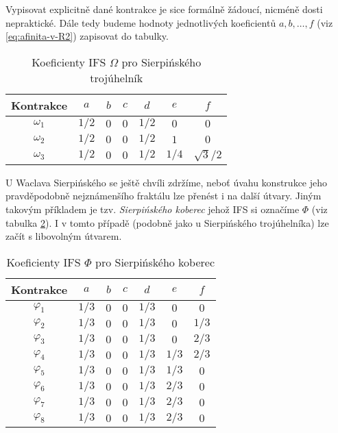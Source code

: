 Vypisovat explicitně dané kontrakce je sice formálně žádoucí, nicméně dosti nepraktické. Dále tedy budeme hodnoty jednotlivých koeficientů $a,b,\ldots,f$ (viz \eqref{eq:afinita-v-R2}) zapisovat do tabulky.
\begin{table}[h]
    \centering
    \begin{tabular}{c|cccccc}
    Kontrakce  & $a$   & $b$ & $c$ & $d$   & $e$   & $f$          \\\hline
    $\omega_1$ & $1/2$ & $0$ & $0$ & $1/2$ & $0$   & $0$          \\
    $\omega_2$ & $1/2$ & $0$ & $0$ & $1/2$ & $1$   & $0$          \\
    $\omega_3$ & $1/2$ & $0$ & $0$ & $1/2$ & $1/4$ & $\sqrt{3}/2$ \\
    \end{tabular}
    \caption{Koeficienty IFS $\Omega$ pro Sierpińského trojúhelník}
    \label{table:ifs-sierpinskeho-trojuhelnik}
\end{table}
U Waclava Sierpińského se ještě chvíli zdržíme, neboť úvahu konstrukce jeho pravděpodobně nejznámenšího fraktálu lze přenést i na další útvary. Jiným takovým příkladem je tzv. \emph{Sierpińského koberec} jehož IFS si označíme $\Phi$ (viz tabulka \ref{table:ifs-sierpinskeho-koberec}). I v tomto případě (podobně jako u Sierpińského trojúhelníka) lze začít s libovolným útvarem. 
\begin{table}[h]
    \centering
    \begin{tabular}{c|cccccc}
    Kontrakce  & $a$   & $b$ & $c$ & $d$   & $e$   & $f$          \\\hline
    $\varphi_1$ & $1/3$ & $0$ & $0$ & $1/3$ & $0$   & $0$         \\
    $\varphi_2$ & $1/3$ & $0$ & $0$ & $1/3$ & $0$   & $1/3$         \\
    $\varphi_3$ & $1/3$ & $0$ & $0$ & $1/3$ & $0$   & $2/3$         \\
    $\varphi_4$ & $1/3$ & $0$ & $0$ & $1/3$ & $1/3$   & $2/3$         \\
    $\varphi_5$ & $1/3$ & $0$ & $0$ & $1/3$ & $1/3$   & $0$         \\
    $\varphi_6$ & $1/3$ & $0$ & $0$ & $1/3$ & $2/3$   & $0$         \\
    $\varphi_7$ & $1/3$ & $0$ & $0$ & $1/3$ & $2/3$   & $0$         \\
    $\varphi_8$ & $1/3$ & $0$ & $0$ & $1/3$ & $2/3$   & $0$
    \end{tabular}
    \caption{Koeficienty IFS $\Phi$ pro Sierpińského koberec}
    \label{table:ifs-sierpinskeho-koberec}
\end{table}
